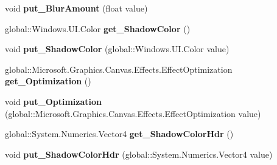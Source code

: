\begin{DoxyCompactItemize}
\mbox{\label{class_microsoft_1_1_graphics_1_1_canvas_1_1_effects_1_1_shadow_effect_a7a269550a65eebb6e9635d3b6bd9b2b1}} 
void {\bfseries put\+\_\+\+Blur\+Amount} (float value)
\item 
\mbox{\label{class_microsoft_1_1_graphics_1_1_canvas_1_1_effects_1_1_shadow_effect_a4398f180b368e7f56f3a362d05ba18d2}} 
global\+::\+Windows.\+U\+I.\+Color {\bfseries get\+\_\+\+Shadow\+Color} ()
\item 
\mbox{\label{class_microsoft_1_1_graphics_1_1_canvas_1_1_effects_1_1_shadow_effect_ace9e753564ded7c048bec73be26b3136}} 
void {\bfseries put\+\_\+\+Shadow\+Color} (global\+::\+Windows.\+U\+I.\+Color value)
\item 
\mbox{\label{class_microsoft_1_1_graphics_1_1_canvas_1_1_effects_1_1_shadow_effect_a79e6fe830147ee5d2fc99f933916a815}} 
global\+::\+Microsoft.\+Graphics.\+Canvas.\+Effects.\+Effect\+Optimization {\bfseries get\+\_\+\+Optimization} ()
\item 
\mbox{\label{class_microsoft_1_1_graphics_1_1_canvas_1_1_effects_1_1_shadow_effect_ae516e5cfdeacbc1ea31669a53415a11c}} 
void {\bfseries put\+\_\+\+Optimization} (global\+::\+Microsoft.\+Graphics.\+Canvas.\+Effects.\+Effect\+Optimization value)
\item 
\mbox{\label{class_microsoft_1_1_graphics_1_1_canvas_1_1_effects_1_1_shadow_effect_af69aa0225a7b96c1ff39ea116af417b7}} 
global\+::\+System.\+Numerics.\+Vector4 {\bfseries get\+\_\+\+Shadow\+Color\+Hdr} ()
\item 
\mbox{\label{class_microsoft_1_1_graphics_1_1_canvas_1_1_effects_1_1_shadow_effect_a6cbf0da6741b9951835c9e913616a2bc}} 
void {\bfseries put\+\_\+\+Shadow\+Color\+Hdr} (global\+::\+System.\+Numerics.\+Vector4 value)
\item 

\end{DoxyCompactItemize}
